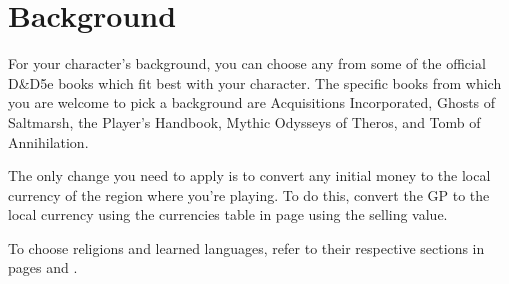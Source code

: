 \section{Background}

For your character's background, you can choose any from some of the official D\&D5e books which fit best with your character.
The specific books from which you are welcome to pick a background are Acquisitions Incorporated, Ghosts of Saltmarsh, the Player's Handbook, Mythic Odysseys of Theros, and Tomb of Annihilation.

The only change you need to apply is to convert any initial money to the local currency of the region where you're playing.
To do this, convert the GP to the local currency using the currencies table in page \pageref{sec::currency} using the selling value.

To choose religions and learned languages, refer to their respective sections in pages \pageref{ssec::religions} and \pageref{ssec::languages}.

